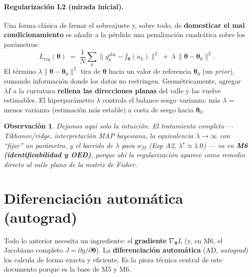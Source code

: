 \documentclass[11pt,a4paper]{article}
\newtheorem{remark}{Observación}
\newcommand{\thetavec}{\bm{\theta}}
\begin{document}
\paragraph{Regularización L2 (mirada inicial).} Una forma clásica de frenar el sobreajuste y, sobre todo, de \textbf{domesticar el mal condicionamiento} es añadir a la pérdida una penalización cuadrática sobre los parámetros:
$$
L_{\text{reg}}(\thetavec) \;=\; \frac{1}{N}\sum_{k}\big\lVert y_k^{\text{obs}} - f_{\thetavec}(u_k)\big\rVert^2 \;+\; \lambda\,\lVert \thetavec - \thetavec_0\rVert^2 .
$$
El término $\lambda\lVert\thetavec-\thetavec_0\rVert^2$ tira de $\thetavec$ hacia un valor de referencia $\thetavec_0$ (un \emph{prior}), sumando información donde los datos no restringen. Geométricamente, agregar $\lambda I$ a la curvatura \textbf{rellena las direcciones planas} del valle y las vuelve estimables. El hiperparámetro $\lambda$ controla el balance sesgo--varianza: más $\lambda$ = menos varianza (estimación más estable) a costa de sesgo hacia $\thetavec_0$.

\begin{remark}
Dejamos aquí solo la intuición. El tratamiento completo --- Tikhonov/ridge, interpretación MAP bayesiana, la equivalencia $\lambda\to\infty$ con ``fijar'' un parámetro, y el barrido de $\lambda$ para $w_{II}$ (Exp A2, $\lambda^\star\approx 1.0$) --- va en \textbf{M6 (identificabilidad y OED)}, porque ahí la regularización aparece como remedio directo al valle plano de la matriz de Fisher.
\end{remark}

\section{Diferenciación automática (autograd)}
\label{sec:autograd}

Todo lo anterior necesita un ingrediente: el \textbf{gradiente} $\nabla_{\thetavec}L$ (y, en M6, el Jacobiano completo $J=\partial y/\partial\thetavec$). La \textbf{diferenciación automática} (AD, \emph{autograd}) los calcula de forma exacta y eficiente. Es la pieza técnica central de este documento porque es la base de M5 y M6.
\end{document}
